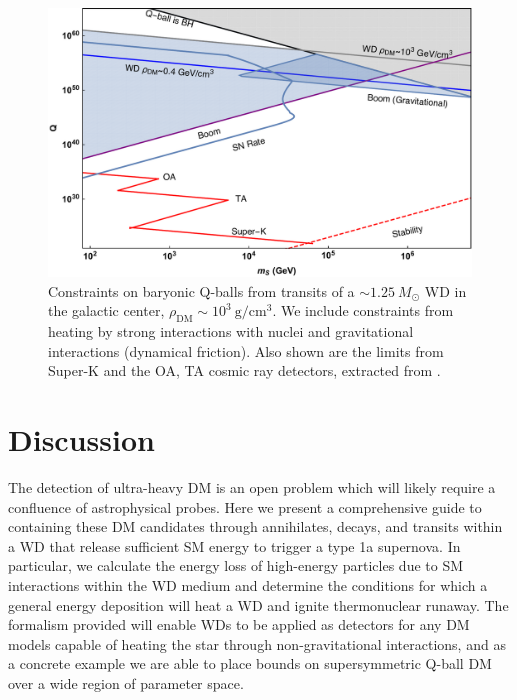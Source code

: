 \documentclass[twocolumn, preprintnumbers,amsmath,amssymb,prd, superscriptaddress]{revtex4}
\begin{document}
\begin{figure}
\includegraphics[scale=.3]{Qballconstraint.pdf}
\caption{Constraints on baryonic Q-balls from transits of a $\sim 1.25 ~M_{\odot}$ WD in the galactic center, $\rho_\text{DM} \sim 10^3 ~\text{g}/\text{cm}^3$.
We include constraints from heating by strong interactions with nuclei and gravitational interactions (dynamical friction).
Also shown are the limits from Super-K and the OA, TA cosmic ray detectors, extracted from \cite{Dine:2003ax}.}
\label{fig:Qballconstraint}
\end{figure}

\section{Discussion}
\label{sec:Discussion}

The detection of ultra-heavy DM is an open problem which will likely require a confluence of astrophysical probes.
Here we present a comprehensive guide to containing these DM candidates through annihilates, decays, and transits within a WD that release sufficient SM energy to trigger a type 1a supernova.
In particular, we calculate the energy loss of high-energy particles due to SM interactions within the WD medium and determine the conditions for which a general energy deposition will heat a WD and ignite thermonuclear runaway.
The formalism provided will enable WDs to be applied as detectors for any DM models capable of heating the star through non-gravitational interactions, and as a concrete example we are able to place bounds on supersymmetric Q-ball DM over a wide region of parameter space.
\end{document}
